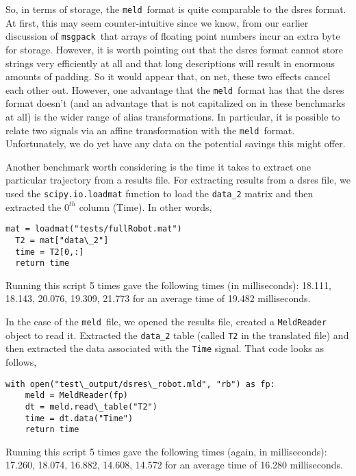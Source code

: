 \documentclass[11pt,a4paper,onecolumn]{article}
\newcommand{\meld}{\texttt{meld}}
\newcommand{\msgpack}{\texttt{msgpack}}
\newcommand{\code}[1]{\texttt{#1}} %
\begin{document}
So, in terms of storage, the \meld\ format is quite comparable to the
dsres format.  At first, this may seem counter-intuitive since we
know, from our earlier discussion of \msgpack\ that arrays of floating
point numbers incur an extra byte for storage.  However, it is worth
pointing out that the dsres format cannot store strings very
efficiently at all and that long descriptions will result in enormous
amounts of padding.  So it would appear that, on net, these two
effects cancel each other out.  However, one advantage that the
\meld\ format has that the dsres format doesn't (and an advantage that
is not capitalized on in these benchmarks at all) is the wider range
of alias transformations.  In particular, it is possible to relate two
signals via an affine transformation with the \meld\ format.
Unfortunately, we do yet have any data on the potential savings this
might offer.


Another benchmark worth considering is the time it takes to extract
one particular trajectory from a results file.  For extracting results
from a dsres file, we used the \code{scipy.io.loadmat} function to
load the \code{data\_2} matrix and then extracted the $0^{th}$ column
(Time).  In other words,

\lstset{language=python}
\begin{lstlisting}[frame=single]  % Start your code-block
  mat = loadmat("tests/fullRobot.mat")
  T2 = mat["data\_2"]
  time = T2[0,:]
  return time
\end{lstlisting}

Running this script 5 times gave the following times (in
milliseconds): 18.111, 18.143, 20.076, 19.309, 21.773 for an average time
of 19.482 milliseconds.

In the case of the \meld\ file, we opened the results file, created a
\code{MeldReader} object to read it.  Extracted the \code{data\_2}
table (called \code{T2} in the translated file) and then extracted the
data associated with the \code{Time} signal.  That code looks as
follows,

\lstset{language=python}
\begin{lstlisting}[frame=single]  % Start your code-block
  with open("test\_output/dsres\_robot.mld", "rb") as fp:
    meld = MeldReader(fp)
    dt = meld.read\_table("T2")
    time = dt.data("Time")
    return time
\end{lstlisting}

Running this script 5 times gave the following times (again, in
milliseconds): 17.260, 18.074, 16.882, 14.608, 14.572 for an average
time of 16.280 milliseconds.
\end{document}

